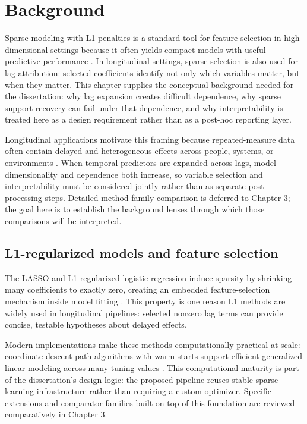 
\chapter{Background}

Sparse modeling with L1 penalties is a standard tool for feature selection in high-dimensional settings because it often yields compact models with useful predictive performance \autocites{tibshirani1996,AYNg2004Feature}. In longitudinal settings, sparse selection is also used for lag attribution: selected coefficients identify not only which variables matter, but when they matter. This chapter supplies the conceptual background needed for the dissertation: why lag expansion creates difficult dependence, why sparse support recovery can fail under that dependence, and why interpretability is treated here as a design requirement rather than as a post-hoc reporting layer.

Longitudinal applications motivate this framing because repeated-measure data often contain delayed and heterogeneous effects across people, systems, or environments \autocites{hiploylee2017,wong2010longitudinal,sorvali2021farmer}. When temporal predictors are expanded across lags, model dimensionality and dependence both increase, so variable selection and interpretability must be considered jointly rather than as separate post-processing steps. Detailed method-family comparison is deferred to Chapter 3; the goal here is to establish the background lenses through which those comparisons will be interpreted.

\section{L1-regularized models and feature selection}
The LASSO and L1-regularized logistic regression induce sparsity by shrinking many coefficients to exactly zero, creating an embedded feature-selection mechanism inside model fitting \autocite{tibshirani1996}. This property is one reason L1 methods are widely used in longitudinal pipelines: selected nonzero lag terms can provide concise, testable hypotheses about delayed effects.

Modern implementations make these methods computationally practical at scale: coordinate-descent path algorithms with warm starts support efficient generalized linear modeling across many tuning values \autocites{fried2010,tay2023}. This computational maturity is part of the dissertation's design logic: the proposed pipeline reuses stable sparse-learning infrastructure rather than requiring a custom optimizer. Specific extensions and comparator families built on top of this foundation are reviewed comparatively in Chapter 3.

